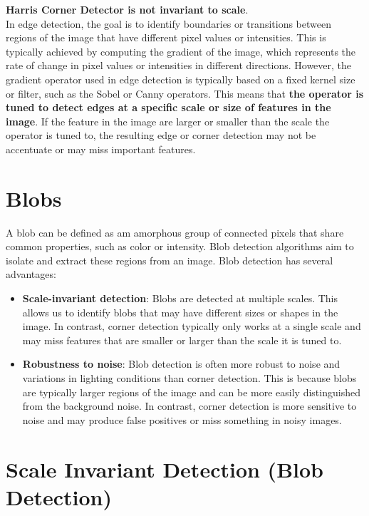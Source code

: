 \documentclass{article}
\begin{document}
\textbf{Harris Corner Detector is not invariant to scale}. \\

In edge detection, the goal is to identify boundaries or transitions between regions of the image that have different pixel values or intensities. This is typically achieved by computing the gradient of the image, which represents the rate of change in pixel values or intensities in different directions. However, the gradient operator used in edge detection is typically based on a fixed kernel size or filter, such as the Sobel or Canny operators. This means that \textbf{the operator is tuned to detect edges at a specific scale or size of features in the image}. If the feature in the image are larger or smaller than the scale the operator is tuned to, the resulting edge or corner detection may not be accentuate or may miss important features. \\

\newpage

\section*{Blobs}

A blob can be defined as am amorphous group of connected pixels that share common properties, such as color or intensity. Blob detection algorithms aim to isolate and extract these regions from an image. Blob detection has several advantages:

\begin{itemize}
    \item \textbf{Scale-invariant detection}: Blobs are detected at multiple scales. This allows us to identify blobs that may have different sizes or shapes in the image. In contrast, corner detection typically only works at a single scale and may miss features that are smaller or larger than the scale it is tuned to.
    \item \textbf{Robustness to noise}: Blob detection is often more robust to noise and variations in lighting conditions than corner detection. This is because blobs are typically larger regions of the image and can be more easily distinguished from the background noise. In contrast, corner detection is more sensitive to noise and may produce false positives or miss something in noisy images.
\end{itemize}

\section*{Scale Invariant Detection (Blob Detection)}
\end{document}

